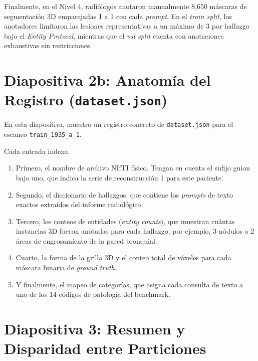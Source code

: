 \documentclass[11pt, a4paper]{article}
\begin{document}
Finalmente, en el Nivel 4, radiólogos anotaron manualmente 8,650 máscaras de segmentación 3D emparejadas 1 a 1 con cada \textit{prompt}. En el \textit{train split}, los anotadores limitaron las lesiones representativas a un máximo de 3 por hallazgo bajo el \textit{Entity Protocol}, mientras que el \textit{val split} cuenta con anotaciones exhaustivas sin restricciones.

\bigskip

\section{Diapositiva 2b: Anatomía del Registro (\texttt{dataset.json})}

En esta diapositiva, muestro un registro concreto de \texttt{dataset.json} para el escaneo \texttt{train\_1935\_a\_1}.

Cada entrada indexa:
\begin{enumerate}[leftmargin=1.5em]
    \item Primero, el nombre de archivo NIfTI físico. Tengan en cuenta el sufijo guion bajo uno, que indica la serie de reconstrucción 1 para este paciente.
    \item Segundo, el diccionario de hallazgos, que contiene los \textit{prompts} de texto exactos extraídos del informe radiológico.
    \item Tercero, los conteos de entidades (\textit{entity counts}), que muestran cuántas instancias 3D fueron anotadas para cada hallazgo; por ejemplo, 3 nódulos o 2 áreas de engrosamiento de la pared bronquial.
    \item Cuarto, la forma de la grilla 3D y el conteo total de vóxeles para cada máscara binaria de \textit{ground truth}.
    \item Y finalmente, el mapeo de categorías, que asigna cada consulta de texto a uno de los 14 códigos de patología del benchmark.
\end{enumerate}

\bigskip

\section{Diapositiva 3: Resumen y Disparidad entre Particiones}
\end{document}
